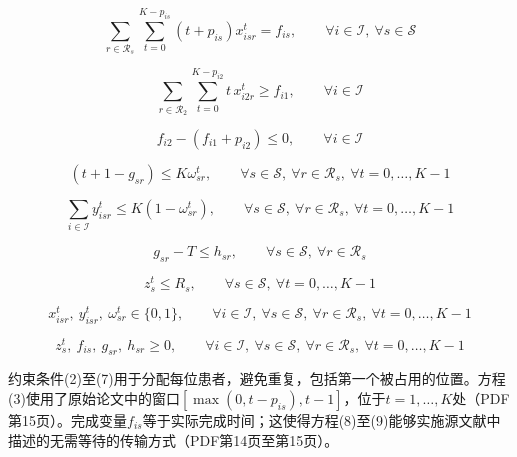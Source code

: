 \documentclass{article}
\begin{document}
\begin{equation}
\sum_{r \in \mathcal{R}_s} \sum_{t=0}^{K-p_{is}} (t+p_{is}) x_{isr}^t = f_{is},
\qquad
\forall i \in \mathcal{I},\ \forall s \in \mathcal{S}
\tag{7}
\end{equation}

\begin{equation}
\sum_{r \in \mathcal{R}_2} \sum_{t=0}^{K-p_{i2}} t \, x_{i2r}^t \ge f_{i1},
\qquad
\forall i \in \mathcal{I}
\tag{8}
\end{equation}

\begin{equation}
f_{i2} - (f_{i1} + p_{i2}) \le 0,
\qquad
\forall i \in \mathcal{I}
\tag{9}
\end{equation}

\begin{equation}
(t+1-g_{sr}) \le K\omega_{sr}^t,
\qquad
\forall s \in \mathcal{S},\ \forall r \in \mathcal{R}_s,\ \forall t = 0,\ldots,K-1
\tag{10}
\end{equation}

\begin{equation}
\sum_{i \in \mathcal{I}} y_{isr}^t \le K(1-\omega_{sr}^t),
\qquad
\forall s \in \mathcal{S},\ \forall r \in \mathcal{R}_s,\ \forall t = 0,\ldots,K-1
\tag{11}
\end{equation}

\begin{equation}
g_{sr} - T \le h_{sr},
\qquad
\forall s \in \mathcal{S},\ \forall r \in \mathcal{R}_s
\tag{12}
\end{equation}

\begin{equation}
z_s^t \le R_s,
\qquad
\forall s \in \mathcal{S},\ \forall t = 0,\ldots,K-1
\tag{13}
\end{equation}

\begin{equation}
x_{isr}^t,\ y_{isr}^t,\ \omega_{sr}^t \in \{0,1\},
\qquad
\forall i \in \mathcal{I},\ \forall s \in \mathcal{S},\ \forall r \in \mathcal{R}_s,\ \forall t = 0,\ldots,K-1
\tag{14}
\end{equation}

\begin{equation}
z_s^t,\ f_{is},\ g_{sr},\ h_{sr} \ge 0,
\qquad
\forall i \in \mathcal{I},\ \forall s \in \mathcal{S},\ \forall r \in \mathcal{R}_s,\ \forall t = 0,\ldots,K-1
\tag{15}
\end{equation}

约束条件(2)至(7)用于分配每位患者，避免重复，包括第一个被占用的位置。方程(3)使用了原始论文中的窗口$[\max(0,t-p_{is}),t-1]$，位于$t=1,\ldots,K$处（PDF第15页）。完成变量$f_{is}$等于实际完成时间；这使得方程(8)至(9)能够实施源文献中描述的无需等待的传输方式（PDF第14页至第15页）。
\end{document}
